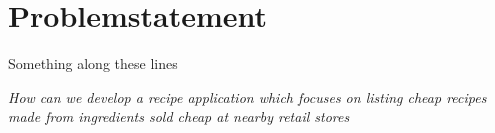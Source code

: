 \section{Problemstatement}
\label{sec:probstate}

Something along these lines

\emph{How can we develop a recipe application which focuses on listing cheap recipes made from ingredients sold cheap at nearby retail stores}
